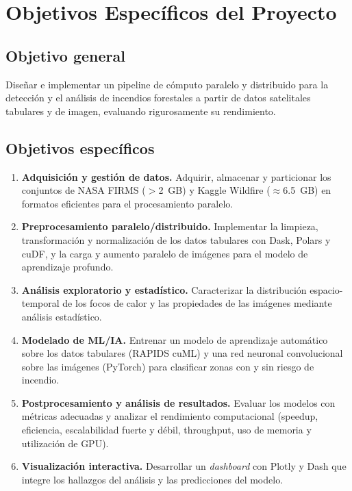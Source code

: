 \section{Objetivos Específicos del Proyecto}
\label{sec:objetivos}

\subsection{Objetivo general}
Diseñar e implementar un pipeline de cómputo paralelo y distribuido para la detección y el análisis de incendios forestales a partir de datos satelitales tabulares y de imagen, evaluando rigurosamente su rendimiento.

\subsection{Objetivos específicos}
\begin{enumerate}
\item \textbf{Adquisición y gestión de datos.} Adquirir, almacenar y particionar los conjuntos de NASA FIRMS ($>$2~GB) y Kaggle Wildfire ($\approx$6.5~GB) en formatos eficientes para el procesamiento paralelo.
\item \textbf{Preprocesamiento paralelo/distribuido.} Implementar la limpieza, transformación y normalización de los datos tabulares con Dask, Polars y cuDF, y la carga y aumento paralelo de imágenes para el modelo de aprendizaje profundo.
\item \textbf{Análisis exploratorio y estadístico.} Caracterizar la distribución espacio-temporal de los focos de calor y las propiedades de las imágenes mediante análisis estadístico.
\item \textbf{Modelado de ML/IA.} Entrenar un modelo de aprendizaje automático sobre los datos tabulares (RAPIDS cuML) y una red neuronal convolucional sobre las imágenes (PyTorch) para clasificar zonas con y sin riesgo de incendio.
\item \textbf{Postprocesamiento y análisis de resultados.} Evaluar los modelos con métricas adecuadas y analizar el rendimiento computacional (speedup, eficiencia, escalabilidad fuerte y débil, throughput, uso de memoria y utilización de GPU).
\item \textbf{Visualización interactiva.} Desarrollar un \textit{dashboard} con Plotly y Dash que integre los hallazgos del análisis y las predicciones del modelo.
\end{enumerate}

